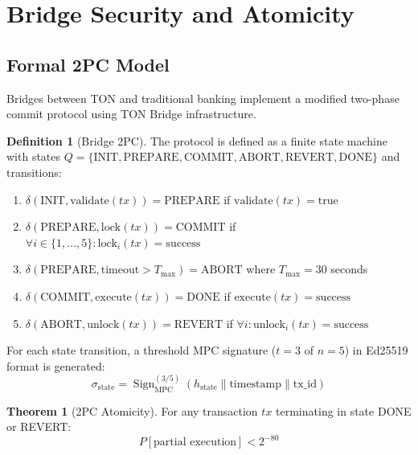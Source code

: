 \documentclass[12pt,a4paper]{article}
\theoremstyle{definition}
\newtheorem{definition}{Definition}[section]
\newtheorem{theorem}{Theorem}[section]
\theoremstyle{remark}
\DeclareMathOperator{\Sign}{Sign}
\begin{document}
\section{Bridge Security and Atomicity}
\label{sec:bridge-security}

\subsection{Formal 2PC Model}

Bridges between TON and traditional banking implement a modified two-phase commit protocol using TON Bridge infrastructure.

\begin{definition}[Bridge 2PC]
The protocol is defined as a finite state machine with states $Q = \{\text{INIT}, \text{PREPARE}, \text{COMMIT}, \text{ABORT}, \text{REVERT}, \text{DONE}\}$ and transitions:
\begin{enumerate}[nosep]
    \item $\delta(\text{INIT}, \text{validate}(tx)) = \text{PREPARE}$ if $\text{validate}(tx) = \text{true}$
    \item $\delta(\text{PREPARE}, \text{lock}(tx)) = \text{COMMIT}$ if $\forall i \in \{1,\ldots,5\}: \text{lock}_i(tx) = \text{success}$
    \item $\delta(\text{PREPARE}, \text{timeout} > T_{\max}) = \text{ABORT}$ where $T_{\max} = 30$ seconds
    \item $\delta(\text{COMMIT}, \text{execute}(tx)) = \text{DONE}$ if $\text{execute}(tx) = \text{success}$
    \item $\delta(\text{ABORT}, \text{unlock}(tx)) = \text{REVERT}$ if $\forall i: \text{unlock}_i(tx) = \text{success}$
\end{enumerate}
\end{definition}

For each state transition, a threshold MPC signature ($t = 3$ of $n = 5$) in Ed25519 format is generated:
\begin{equation}
\sigma_{\text{state}} = \Sign^{(3/5)}_{\text{MPC}}(h_{\text{state}} \| \text{timestamp} \| \text{tx\_id})
\end{equation}

\begin{theorem}[2PC Atomicity]
\label{thm:2pc-atomicity}
For any transaction $tx$ terminating in state DONE or REVERT:
\begin{equation}
P[\text{partial execution}] < 2^{-80}
\end{equation}
\end{theorem}
\end{document}
